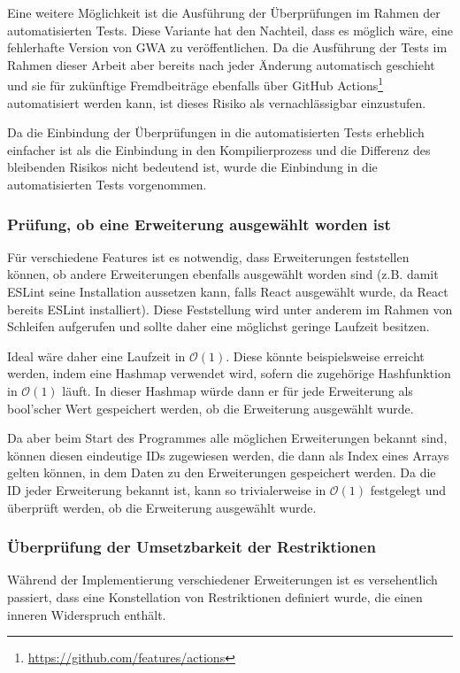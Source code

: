 Eine weitere Möglichkeit ist die Ausführung der Überprüfungen im Rahmen der automatisierten Tests. Diese Variante hat den Nachteil, dass es möglich wäre, eine fehlerhafte Version von \gls{GWA} zu veröffentlichen. Da die Ausführung der Tests im Rahmen dieser Arbeit aber bereits nach jeder Änderung automatisch geschieht und sie für zukünftige Fremdbeiträge ebenfalls über GitHub Actions\footnote{\url{https://github.com/features/actions}} automatisiert werden kann, ist dieses Risiko als vernachlässigbar einzustufen.

Da die Einbindung der Überprüfungen in die automatisierten Tests erheblich einfacher ist als die Einbindung in den Kompilierprozess und die Differenz des bleibenden Risikos nicht bedeutend ist, wurde die Einbindung in die automatisierten Tests vorgenommen.

\subsubsection{Prüfung, ob eine Erweiterung ausgewählt worden ist}
Für verschiedene Features ist es notwendig, dass Erweiterungen feststellen können, ob andere Erweiterungen ebenfalls ausgewählt worden sind (z.B. damit ESLint seine Installation aussetzen kann, falls React ausgewählt wurde, da React bereits ESLint installiert). Diese Feststellung wird unter anderem im Rahmen von Schleifen aufgerufen und sollte daher eine möglichst geringe Laufzeit besitzen.

Ideal wäre daher eine Laufzeit in $\mathcal{O}(1)$. Diese könnte beispielsweise erreicht werden, indem eine Hashmap verwendet wird, sofern die zugehörige Hashfunktion in $\mathcal{O}(1)$ läuft. In dieser Hashmap würde dann er für jede Erweiterung als bool'scher Wert gespeichert werden, ob die Erweiterung ausgewählt wurde.

Da aber beim Start des Programmes alle möglichen Erweiterungen bekannt sind, können diesen eindeutige IDs zugewiesen werden, die dann als Index eines Arrays gelten können, in dem Daten zu den Erweiterungen gespeichert werden. Da die ID jeder Erweiterung bekannt ist, kann so trivialerweise in $\mathcal{O}(1)$ festgelegt und überprüft werden, ob die Erweiterung ausgewählt wurde.

\subsubsection{Überprüfung der Umsetzbarkeit der Restriktionen}
Während  der Implementierung verschiedener Erweiterungen ist es versehentlich passiert, dass eine Konstellation von Restriktionen definiert wurde, die einen inneren Widerspruch enthält.

